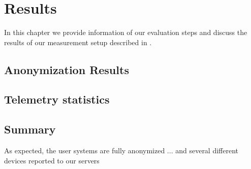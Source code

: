 \chapter{Results}
\label{chap:results}
In this chapter we provide information of our evaluation steps and discuss the results of our measurement setup described in .\\


\section{Anonymization Results}
\label{sec:results:anon}
%




\section{Telemetry statistics}
\label{sec:results:telemetry}
%




\section{Summary}
As expected, the user systems are fully anonymized ... and several different devices reported to our servers
